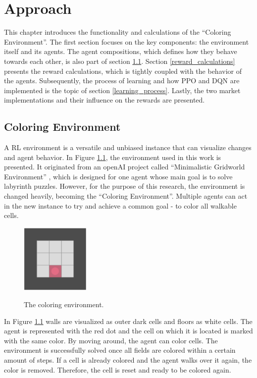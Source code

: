 \chapter{Approach}\label{sec:Approach}
This chapter introduces the functionality and calculations of the ``Coloring Environment''. The first section focuses on the key components: the environment itself and its agents. The agent compositions, which defines how they behave towards each other, is also part of section \ref{env}. Section \ref{reward_calculations} presents the reward calculations, which is tightly coupled with the behavior of the agents. Subsequently, the process of learning and how PPO and DQN are implemented is the topic of section \ref{learning_process}. Lastly, the two market implementations and their influence on the rewards are presented.

\section{Coloring Environment}\label{env}
A RL environment is a versatile and unbiased instance that can visualize changes and agent behavior. In Figure \ref{fig:env}, the environment used in this work is presented. It originated from an openAI project called ``Minimalistic Gridworld Environment'' \cite{chwi18}, which is designed for one agent whose main goal is to solve labyrinth puzzles. However, for the purpose of this research, the environment is changed heavily, becoming the ``Coloring Environment''. Multiple agents can act in the new instance to try and achieve a common goal - to color all walkable cells.

\begin{figure}[hpbt]
    \centering
    \includegraphics[width=0.3\textwidth]{pictures/Gridworld}\\
    \caption[Coloring Environment]{The coloring environment.}\label{fig:env}
\end{figure}

In Figure \ref{fig:env} walls are visualized as outer dark cells and floors as white cells. The agent is represented with the red dot and the cell on which it is located is marked with the same color. By moving around, the agent can color cells. The environment is successfully solved once all fields are colored within a certain amount of steps. If a cell is already colored and the agent walks over it again, the color is removed. Therefore, the cell is reset and ready to be colored again. 

